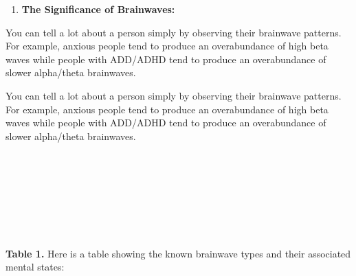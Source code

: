 \documentclass[10pt]{article}
\begin{document}
\begin{enumerate}
\begin{center}
\end{center}


	\item \textbf{{\large The Significance of Brainwaves:}}
\end{enumerate}


{\large You can tell a lot about a person simply by observing their brainwave patterns. For example, anxious people tend to produce an overabundance of high beta waves while people with ADD/ADHD tend to produce an overabundance of slower alpha/theta brainwaves.\\}


 
{\large You can tell a lot about a person simply by observing their brainwave patterns. For example, anxious people tend to produce an overabundance of high beta waves while people with ADD/ADHD tend to produce an overabundance of slower alpha/theta brainwaves.\\\\\\\\\\\\\\\\}



{\large \textbf{Table 1.} Here is a table showing the known brainwave types and their associated mental states:\\}
\end{document}

